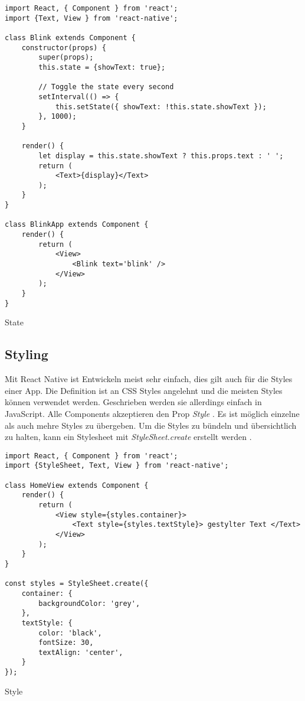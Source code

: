 \begin{listing}[H]
    \begin{verbatim}
import React, { Component } from 'react';
import {Text, View } from 'react-native';

class Blink extends Component {
    constructor(props) {
        super(props);
        this.state = {showText: true};

        // Toggle the state every second
        setInterval(() => {
            this.setState({ showText: !this.state.showText });
        }, 1000);
    }

    render() {
        let display = this.state.showText ? this.props.text : ' ';
        return (
            <Text>{display}</Text>
        );
    }
}

class BlinkApp extends Component {
    render() {
        return (
            <View>
                <Blink text='blink' />
            </View>
        );
    }
}

    \end{verbatim}
    \caption{State \cite{facebook_inc._state_2017}}
    \label{lst:state}
\end{listing}


\subsection{Styling}
Mit React Native ist Entwickeln meist sehr einfach, dies gilt auch für die Styles einer App. Die Definition ist an CSS Styles angelehnt und die meisten Styles können verwendet werden. Geschrieben werden sie allerdings einfach in JavaScript. Alle Components akzeptieren den Prop \textit{Style} \cite{facebook_inc._style_2017}. Es ist möglich einzelne als auch mehre Styles zu übergeben. Um die Styles zu bündeln und übersichtlich zu halten, kann ein Stylesheet mit \textit{StyleSheet.create} erstellt werden \cite{facebook_inc._style_2017}. 

\begin{listing}[H]
    \begin{verbatim}
import React, { Component } from 'react';
import {StyleSheet, Text, View } from 'react-native';

class HomeView extends Component {
    render() {
        return (
            <View style={styles.container}>
                <Text style={styles.textStyle}> gestylter Text </Text>
            </View>
        );
    }
}

const styles = StyleSheet.create({
    container: {
        backgroundColor: 'grey',
    },
    textStyle: {
        color: 'black',
        fontSize: 30,
        textAlign: 'center',
    }
});    
    \end{verbatim}
    \caption{Style}
    \label{lst:style}
\end{listing}

